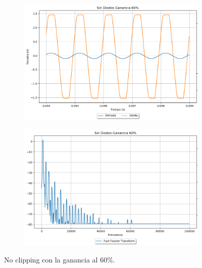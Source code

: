 \begin{figure}[H]
\hspace{-7.5em}
	\begin{subfigure}{0.5\textwidth}
		\includegraphics[width=1.5\textwidth, trim={0 0 0 0}, clip]{Ejercicio5/Imagenes/Propuesto/Mediciones/alone2.png}
		\label{fig:prop_alone2}
	\end{subfigure}
	\hspace{6em}
	\begin{subfigure}{0.5\textwidth}
		\includegraphics[width=1.5\textwidth, trim={0 0 0 0}, clip]{Ejercicio5/Imagenes/Propuesto/Mediciones/alone2fft.png}
		\centering
		\label{fig:prop_alone2fft}
	\end{subfigure}
	\caption{No clipping con la ganancia al 60\%.}
\end{figure}

